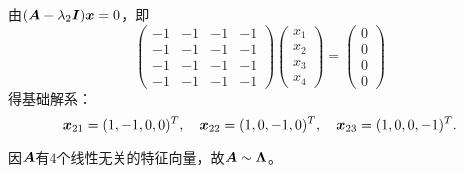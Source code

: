 \begin{jie}
  由$(\boldsymbol{A}-\lambda_2\boldsymbol{I}){\boldsymbol{x}}=0$，即
  $$
  \left(
    \begin{array}{rrrr}
      -1&-1&-1&-1\\
      -1&-1&-1&-1\\
      -1&-1&-1&-1\\
      -1&-1&-1&-1
    \end{array}
  \right)
  \left(
    \begin{array}{c}
      x_1\\x_2\\x_3\\x_4
    \end{array}
  \right)=
  \left(
    \begin{array}{c}
      0\\0\\0\\0
    \end{array}
  \right)
  $$
  得基础解系：
  $$
  {\boldsymbol{x}}_{21}=(1,-1,0,0)^T, \quad
  {\boldsymbol{x}}_{22}=(1,0,-1,0)^T, \quad
  {\boldsymbol{x}}_{23}=(1,0,0,-1)^T.
  $$

  因$\boldsymbol{A}$有$4$个线性无关的特征向量，故$\boldsymbol{A}\sim \boldsymbol{\Lambda}$。


\end{jie}
